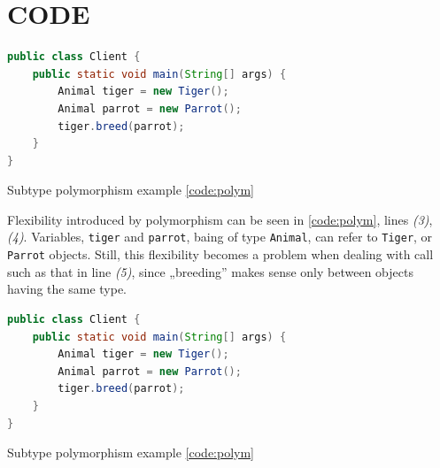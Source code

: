 \section{CODE}

\begin{code}
	\begin{lstlisting}[language=Java]
public class Client {
    public static void main(String[] args) {
        Animal tiger = new Tiger();
        Animal parrot = new Parrot();
        tiger.breed(parrot);
    }
}
	\end{lstlisting}
	\caption{Subtype polymorphism example \cref{code:polym}}
	\label{code:polym}
\end{code}
Flexibility introduced by polymorphism can be seen in \cref{code:polym}, lines \textit{(3)}, \textit{(4)}. Variables, \texttt{tiger} and \texttt{parrot}, baing of type \texttt{Animal}, can refer to \texttt{Tiger}, or \texttt{Parrot} objects. Still, this flexibility becomes a problem when dealing with call such as that in line \textit{(5)}, since „breeding” makes sense only between objects having the same type.

\begin{code}[H]
	\begin{lstlisting}[language=Java]
public class Client {
	public static void main(String[] args) {
		Animal tiger = new Tiger();
		Animal parrot = new Parrot();
		tiger.breed(parrot);
	}
}
	\end{lstlisting}
	\caption{Subtype polymorphism example \cref{code:polym}}
	\label{code:polym2}
\end{code}
